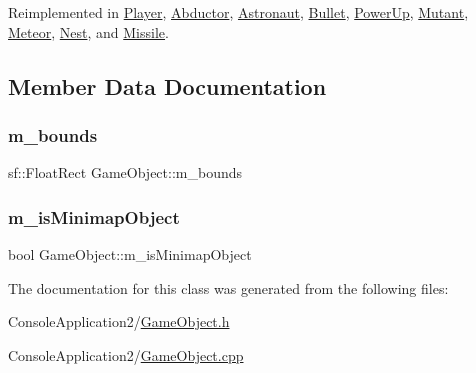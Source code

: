 Reimplemented in \hyperlink{class_player_a09c333f62472d3ca96ef147126b518cd}{Player}, \hyperlink{class_abductor_a4623b394ad899b8df96b52e997fa5b03}{Abductor}, \hyperlink{class_astronaut_ab552db56a9d7341b3ce8f8a9b3670004}{Astronaut}, \hyperlink{class_bullet_ac33e38185d1800e4a532c71a620d1bf7}{Bullet}, \hyperlink{class_power_up_ad9ec62c1a3832e17949044c8349d0afb}{Power\+Up}, \hyperlink{class_mutant_a3bc5b923cb3605ddd10a5064ec904d29}{Mutant}, \hyperlink{class_meteor_a49fe47a23c6622f9850e81eac5c53ec2}{Meteor}, \hyperlink{class_nest_a763db342ea691c22d37b4905c1d022fa}{Nest}, and \hyperlink{class_missile_ae4d7aa6babf40ea774097bfa0f7c9ff7}{Missile}.



\subsection{Member Data Documentation}
\hypertarget{class_game_object_a6cb7e612660cf9ef98b573dd50407e20}{}\label{class_game_object_a6cb7e612660cf9ef98b573dd50407e20} 
\subsubsection{\texorpdfstring{m\+\_\+bounds}{m\_bounds}}
{\footnotesize\ttfamily sf\+::\+Float\+Rect Game\+Object\+::m\+\_\+bounds\hspace{0.3cm}{\ttfamily [protected]}}

\hypertarget{class_game_object_a0ebb879c289d02bd83519e6c60dca27b}{}\label{class_game_object_a0ebb879c289d02bd83519e6c60dca27b} 
\subsubsection{\texorpdfstring{m\+\_\+is\+Minimap\+Object}{m\_isMinimapObject}}
{\footnotesize\ttfamily bool Game\+Object\+::m\+\_\+is\+Minimap\+Object\hspace{0.3cm}{\ttfamily [protected]}}



The documentation for this class was generated from the following files\+:\begin{DoxyCompactItemize}
\item 
Console\+Application2/\hyperlink{_game_object_8h}{Game\+Object.\+h}\item 
Console\+Application2/\hyperlink{_game_object_8cpp}{Game\+Object.\+cpp}\end{DoxyCompactItemize}
